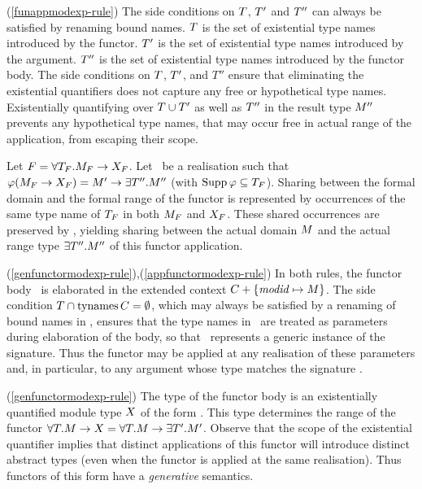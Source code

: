 \comments
 \begin{description}
 \item{(\ref{funappmodexp-rule})}
 The side conditions on $T$, $T'$ and $T''$  can always
 be satisfied by renaming bound names. 
 $T$ is the set of existential type names introduced by the functor.
 $T'$ is the set of existential type names introduced by the argument.
 $T''$ is the set of existential type names introduced by the functor body.
 The side conditions on $T$, $T'$, and $T''$ ensure
 that eliminating the existential quantifiers 
 does not capture any free or hypothetical type names. 
 Existentially quantifying over $T\cup T'$ as well as $T''$ in the result type
 $M''$  prevents any  hypothetical type names,
 that may occur free in actual range of the application,
 from escaping their scope.

 Let $F=\forall{\ensuremath{T}_{\ensuremath{F}}}{.}{\ensuremath{M}_{\ensuremath{F}}}\rightarrow{\ensuremath{X}_{\ensuremath{F}}}$.  Let \tyrea\ be a
 realisation such that
 $\varphi({M_{F}} \rightarrow {\ensuremath{X}_{\ensuremath{F}}}) =
 {M'} \rightarrow {\ensuremath{\exists{\ensuremath{T}''}{.}{\ensuremath{M}''}}}$ (with $\mathop{\rm Supp}\nolimits\varphi\subseteq T_{F}$). 
 Sharing between the formal domain and
 the formal range of the functor is
 represented by occurrences of the same type name of $T_{F}$ in both $M_{F}$ and 
 $X_{F}$. These shared occurrences are preserved by \tyrea, yielding sharing
 between the actual domain $M$ and the actual range 
 type $\exists{\ensuremath{T}''}{.}{\ensuremath{M}''}$ of this
 functor application.

\item{(\ref{genfunctormodexp-rule}),(\ref{appfunctormodexp-rule})}
     In both rules, the 
     functor body \modexp\ is elaborated in the extended context
     $ C+\{{\it modid}\mapsto M\}$. The side
     condition $ T \cap \mathop{\rm tynames}\nolimits C = \emptyset$, which may always be
     satisfied by a renaming of bound names in \sig{\T}{\M}, ensures
     that the type names in \T\ are treated as parameters during elaboration
     of the body, so that \M\ represents a generic instance of
     the signature. Thus the functor may be applied at any realisation of
     these parameters and, in particular, to any argument whose type matches
     the signature \sig{\T}{\M}.

\item{(\ref{genfunctormodexp-rule})}
     The type of the functor body
     is an existentially quantified module type $X$ of the form .  This type determines
     the range of the functor $\forall{\ensuremath{T}}{.}{\ensuremath{M}}\rightarrow{\ensuremath{X}}=
     \forall{\ensuremath{T}}{.}{\ensuremath{M}}\rightarrow{\ensuremath{\exists{\ensuremath{T}'}{.}{\ensuremath{M}'}}}$.
     Observe that the scope of the existential quantifier implies that distinct
     applications  of this functor will introduce distinct abstract
     types (even when the functor is applied at the same realisation).  
     Thus functors of this form have a {\sl generative} semantics. 


\end{description}
